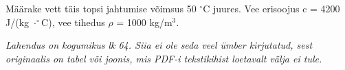 
Määrake vett täis topsi jahtumise võimsus 50 $^\circ$C juures. Vee erisoojus c = 4200 J/(kg $\cdot ^\circ$C), vee tihedus $\rho$ = 1000 kg/m$^3$.

\hint

\solu
\textit{Lahendus on kogumikus lk 64. Siia ei ole seda veel ümber kirjutatud, sest originaalis on tabel või joonis, mis PDF-i tekstikihist loetavalt välja ei tule.}
\probend
